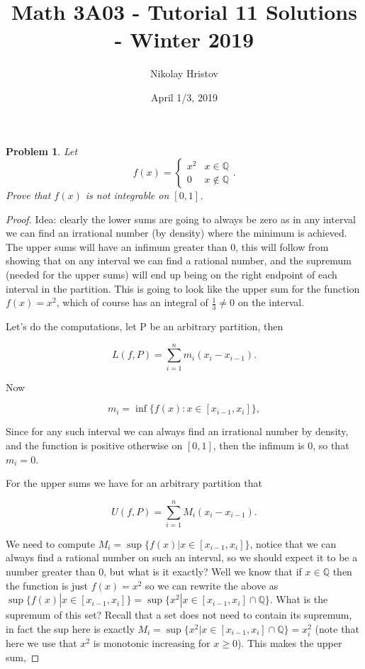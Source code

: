 \documentclass[11pt]{article}
\theoremstyle{plain}
\newtheorem{problem}{Problem}
\theoremstyle{remark}
\newcommand {\mbQ} {\mathbb Q}
\newcommand {\pwi}[4] {\begin{cases} 
		#1 & #2 \\
		#3 & #4
\end{cases}}
\begin{document}
	\title{Math 3A03 - Tutorial 11 Solutions - Winter 2019}
	\author{Nikolay Hristov}
	\date{April 1/3, 2019}
	\maketitle
	
\begin{problem}
	Let \[f(x) = \pwi{x^2}{x\in \mbQ}{0}{x\notin \mbQ}.\] Prove that $f(x)$ is not integrable on $[0,1]$.
\end{problem}

\begin{proof}
	Idea: clearly the lower sums are going to always be zero as in any interval we can find an irrational number (by density) where the minimum is achieved. The upper sums will have an infimum greater than 0, this will follow from showing that on any interval we can find a rational number, and the supremum (needed for the upper sums) will end up being on the right endpoint of each interval in the partition. This is going to look like the upper sum for the function $f(x)=x^2$, which of course has an integral of $\frac 1 3 \neq 0$ on the interval.
	
	Let's do the computations, let P be an arbitrary partition, then 
	
	\[
	L(f,P) = \sum_{i=1}^n m_i (x_i-x_{i-1}).
	\]
	
	Now 
	
	\[
	m_i = \inf \{f(x):x\in [x_{i-1},x_i]\},
	\]
	
	Since for any such interval we can always find an irrational number by density, and the function is positive otherwise on $[0,1]$, then the infimum is 0, so that $m_i=0$.
	
	For the upper sums we have for an arbitrary partition that
	
	\[
	U(f,P) = \sum_{i=1}^n M_i (x_i-x_{i-1}).
	\]
	
	We need to compute $M_{i}=\sup\{f(x)|x\in[x_{i-1},x_i]\}$, notice that we can always find a rational number on such an interval, so we should expect it to be a number greater than 0, but what is it exactly? Well we know that if $x\in \mathbb Q$ then the function is just $f(x)=x^2$ so we can rewrite the above as $\sup\{f(x)|x\in[x_{i-1},x_i]\}=\sup\{x^2|x\in[x_{i-1},x_i]\cap \mathbb Q\}$. What is the supremum of this set? Recall that a set does not need to contain its supremum, in fact the sup here is exactly $M_i=\sup\{x^2|x\in[x_{i-1},x_i]\cap \mathbb Q\}= x_i^2$ (note that here we use that $x^2$ is monotonic increasing for $x\geq 0$). This makes the upper sum,
	

\end{proof}
\end{document}
